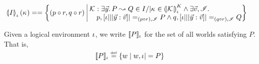 \begin{definition}
\begin{align*}
  \semI[\lenv]{I}(\ca{}) &==
  \left\{
  \begin{array}{@{}l@{\ }|@{\ }r@{}}
    (p \composeL r, q \composeL r)&
    \begin{array}{@{}l@{}}
      \interAss{\capAss{}}{\vec{y}}{P}{Q} \in I /| \ca{} \in \semK[\lenv]{\capAss{}}\land
      \exsts{\vec{v}, \lmod}\\
      \quad p, [\lenv|||\vec y:\vec v] |=_{(p \composeL r), \lmod} P \land
      q, [\lenv|||\vec y:\vec v] |=_{(q \composeL r), \lmod} Q 
    \end{array}
  \end{array}
  \right\}
  \end{align*}
\end{definition}
%
\noindent Given a logical environment $\lenv$, we write $\sem[\lenv]{P}$ for the set of all worlds satisfying $P$. That is, 
%
\[
	\sem[\lenv]{P} \eqdef \left\{ w \mid w, \lenv |= P \right\}
\]	
%
%

